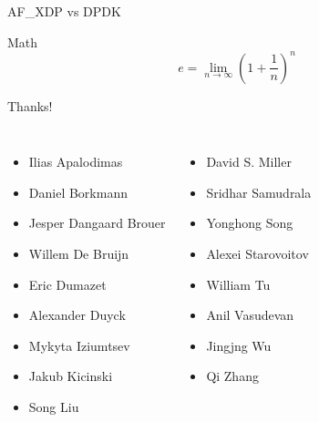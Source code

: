 \documentclass{beamer}
\begin{document}
  \begin{frame}{AF\_XDP vs DPDK}
  \end{frame}
  \begin{frame}{Math}
    \begin{equation*}
      e = \lim_{n\to \infty} \left(1 + \frac{1}{n}\right)^n
    \end{equation*}
  \end{frame}

  \begin{frame}{Thanks!}
  \begin{columns}[T,onlytextwidth]
    \begin{itemize}
    \item Ilias Apalodimas
    \item Daniel Borkmann
    \item Jesper Dangaard Brouer
    \item Willem De Bruijn
    \item Eric Dumazet
    \item Alexander Duyck
    \item Mykyta Iziumtsev
    \item Jakub Kicinski
    \item Song Liu
    \end{itemize}
    
    \begin{itemize}
    \item David S. Miller
    \item Sridhar Samudrala
    \item Yonghong Song
    \item Alexei Starovoitov
    \item William Tu
    \item Anil Vasudevan
    \item Jingjng Wu
    \item Qi Zhang
    \end{itemize}
  \end{columns}
  \end{frame}
\end{document}
